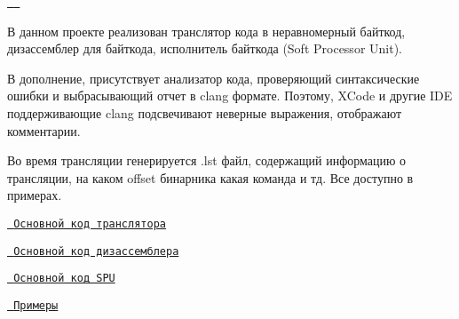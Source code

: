 \href{https://app.codacy.com/gh/AlexRoar/SPUAsm?utm_source=github.com&utm_medium=referral&utm_content=AlexRoar/SPUAsm&utm_campaign=Badge_Grade}{\texttt{ }} \href{https://www.codefactor.io/repository/github/alexroar/spuasm}{\texttt{ }}

В данном проекте реализован транслятор кода в неравномерный байткод, дизассемблер для байткода, исполнитель байткода (Soft Processor Unit).

В дополнение, присутствует анализатор кода, проверяющий синтаксические ошибки и выбрасывающий отчет в clang формате. Поэтому, X\+Code и другие I\+DE поддерживающие clang подсвечивают неверные выражения, отображают комментарии.

Во время трансляции генерируется .lst файл, содержащий информацию о трансляции, на каком offset бинарника какая команда и тд. Все доступно в примерах.

 


\begin{DoxyItemize}
\item \href{https://github.com/AlexRoar/SPUAsm/blob/main/SoftProcessorUnit/Assembly/SPUAssembly.cpp}{\texttt{ Основной код транслятора}}
\item \href{https://github.com/AlexRoar/SPUAsm/blob/main/SoftProcessorUnit/Disassembly/SPUDisAssembly.cpp}{\texttt{ Основной код дизассемблера}}
\item \href{https://github.com/AlexRoar/SPUAsm/blob/main/SoftProcessorUnit/SPU/SPU.cpp}{\texttt{ Основной код S\+PU}}
\item \href{https://github.com/AlexRoar/SPUAsm/tree/main/Examples/SPUAsm/SPUAsm}{\texttt{ Примеры}} 
\end{DoxyItemize}